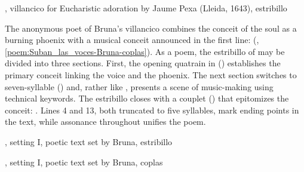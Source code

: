 
\begin{poemexample}
    \caption{, villancico for Eucharistic adoration by
    Jaume Pexa (Lleida, 1643), estribillo}
    \label{poem:Que_me_quemo-Pexa}
\end{poemexample}

The anonymous poet of Bruna's villancico combines the conceit of the soul as a
burning phoenix with a musical conceit announced in the first line:  (,
\ref{poem:Suban_las_voces-Bruna-coplas}).
As a poem, the estribillo of  may be divided into three
sections. 
First, the opening quatrain in  () establishes
the primary conceit linking the voice and the phoenix.
The next section switches to seven-syllable 
() and, rather like , presents
a scene of music-making using technical keywords.
The estribillo closes with a couplet () that epitomizes the
conceit: .
Lines 4 and 13, both truncated to five syllables, mark ending points in the
text, while assonance throughout unifies the poem.


\begin{poemexample}
    \caption{, setting I, poetic text set by
    Bruna, estribillo}
    \label{poem:Suban_las_voces-Bruna-estribillo}
\end{poemexample}

\begin{poemexample}
    \caption{, setting I, poetic text set by Bruna,
    coplas} 
    \label{poem:Suban_las_voces-Bruna-coplas}
\end{poemexample}

